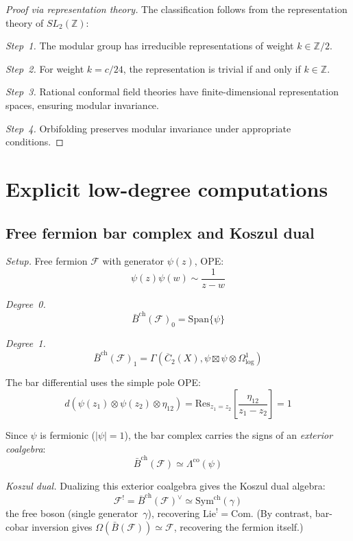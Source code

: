 \begin{proof}[Proof via representation theory]
The classification follows from the representation theory of $SL_2(\mathbb{Z})$:

\emph{Step~1.} The modular group has irreducible representations of weight $k \in \mathbb{Z}/2$.

\emph{Step~2.} For weight $k = c/24$, the representation is trivial if and only if $k \in \mathbb{Z}$.

\emph{Step~3.} Rational conformal field theories have finite-dimensional representation spaces, ensuring modular invariance.

\emph{Step~4.} Orbifolding preserves modular invariance under appropriate conditions.
\end{proof}

\section{Explicit low-degree computations}
\label{sec:explicit-low-degree}

\subsection{Free fermion bar complex and Koszul dual}

\noindent\emph{Setup.} Free fermion $\mathcal{F}$ with generator $\psi(z)$, OPE:
\[\psi(z)\psi(w) \sim \frac{1}{z-w}\]

\emph{Degree~0.}
\[\bar{B}^{\text{ch}}(\mathcal{F})_0 = \text{Span}\{\psi\}\]

\emph{Degree~1.}
\[\bar{B}^{\text{ch}}(\mathcal{F})_1 = \Gamma\left(\overline{C}_2(X),
   \psi \boxtimes \psi \otimes \Omega^1_{\log}\right)\]

The bar differential uses the simple pole OPE:
\[d(\psi(z_1) \otimes \psi(z_2) \otimes \eta_{12}) = \text{Res}_{z_1 = z_2}\left[\frac{\eta_{12}}{z_1-z_2}\right] = 1\]

Since $\psi$ is fermionic ($|\psi| = 1$), the bar complex carries the signs of an \emph{exterior coalgebra}:
\[\bar{B}^{\text{ch}}(\mathcal{F}) \simeq \Lambda^{\text{co}}(\psi)\]

\emph{Koszul dual.} Dualizing this exterior coalgebra gives the Koszul dual algebra:
\[\mathcal{F}^! = \bar{B}^{\mathrm{ch}}(\mathcal{F})^\vee \simeq \mathrm{Sym}^{\mathrm{ch}}(\gamma)\]
the free boson (single generator~$\gamma$), recovering $\mathrm{Lie}^! = \mathrm{Com}$.  (By contrast, bar-cobar inversion gives $\Omega(\bar{B}(\mathcal{F})) \simeq \mathcal{F}$, recovering the fermion itself.)

